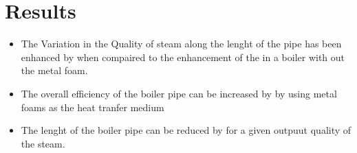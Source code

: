 \documentclass[compileTAMUreport.tex]{subfiles}
\begin{document}
\chapter{Results}
\begin{itemize}
\item The Variation in the Quality of steam along the lenght of the pipe has been enhanced by  when compaired to the enhancement of the in a boiler with out the metal foam.
\item The overall efficiency of the boiler pipe can be increased by  by using metal foams as the heat tranfer medium 
\item The lenght of the boiler pipe can be reduced by for a given outpuut quality of the steam.

\end{itemize}
\end{document}
